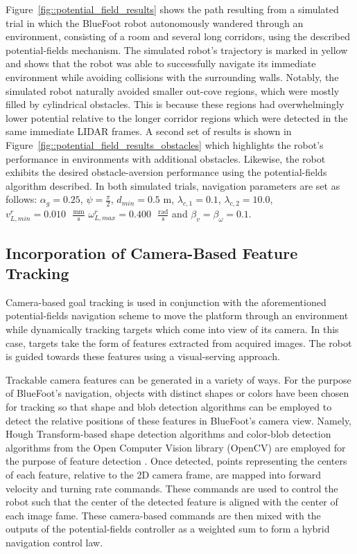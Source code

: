 			Figure~\ref{fig::potential_field_results} shows the path resulting from a simulated trial in which the BlueFoot robot autonomously wandered through an environment, consisting of a room and several long corridors, using the described potential-fields mechanism. The simulated robot's trajectory is marked in yellow and shows that the robot was able to successfully navigate its immediate environment while avoiding collisions with the surrounding walls. Notably, the simulated robot naturally avoided smaller out-cove regions, which were mostly filled by cylindrical obstacles. This is because these regions had overwhelmingly lower potential relative to the longer corridor regions which were detected in the same immediate LIDAR frames. A second set of results is shown in Figure~\ref{fig::potential_field_results_obstacles} which highlights the robot's performance in environments with additional obstacles. Likewise, the robot exhibits the desired obstacle-aversion performance using the potential-fields algorithm described. In both simulated trials, navigation parameters are set as follows: 
				$\alpha_{g}=0.25$,
				$\psi=\frac{\pi}{2}$,
				$d_{min}=0.5\text{ m}$,
				$\lambda_{c,1}=0.1$,
				$\lambda_{c,2}=10.0$, 
				$v_{L,min}^{r}=0.010\text{ }\frac{\text{mm}}{\text{s}}$
				$\omega_{L,max}^{r}=0.400\text{ }\frac{\text{rad}}{\text{s}}$
				and
				$\beta_{v}=\beta_{\omega}=0.1$.


		\subsection{Incorporation of Camera-Based Feature Tracking}
		
			Camera-based goal tracking is used in conjunction with the aforementioned potential-fields navigation scheme to move the platform through an environment while dynamically tracking targets which come into view of its camera. In this case, targets take the form of features extracted from acquired images. The robot is guided towards these features using a visual-serving approach. 

			Trackable camera features can be generated in a variety of ways. For the purpose of BlueFoot's navigation, objects with distinct shapes or colors have been chosen for tracking so that shape and blob detection algorithms can be employed to detect the relative positions of these features in BlueFoot's camera view. Namely, Hough Transform-based shape detection algorithms and color-blob detection algorithms from the Open Computer Vision library (OpenCV) are employed for the purpose of feature detection \cite{opencv_library}. Once detected, points representing the centers of each feature, relative to the 2D camera frame, are mapped into forward velocity and turning rate commands. These commands are used to control the robot such that the center of the detected feature is aligned with the center of each image fame. These camera-based commands are then mixed with the outputs of the potential-fields controller as a weighted sum to form a hybrid navigation control law.


